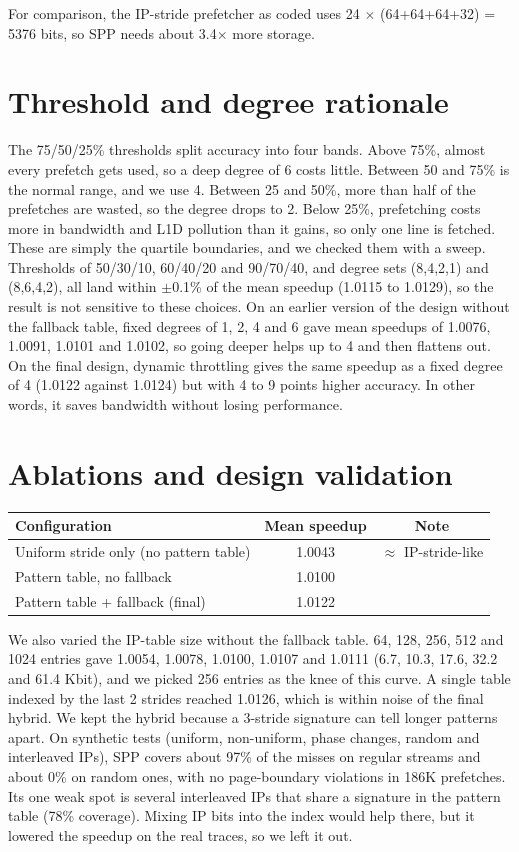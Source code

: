 \documentclass[10pt]{article}
\begin{document}
For comparison, the IP-stride prefetcher as coded uses 24 $\times$ (64+64+64+32) = 5376 bits, so SPP needs about 3.4$\times$ more storage.

\section*{Threshold and degree rationale}
The 75/50/25\% thresholds split accuracy into four bands. Above 75\%, almost every prefetch gets used, so a deep degree of 6 costs little. Between 50 and 75\% is the normal range, and we use 4. Between 25 and 50\%, more than half of the prefetches are wasted, so the degree drops to 2. Below 25\%, prefetching costs more in bandwidth and L1D pollution than it gains, so only one line is fetched. These are simply the quartile boundaries, and we checked them with a sweep. Thresholds of 50/30/10, 60/40/20 and 90/70/40, and degree sets (8,4,2,1) and (8,6,4,2), all land within $\pm$0.1\% of the mean speedup (1.0115 to 1.0129), so the result is not sensitive to these choices. On an earlier version of the design without the fallback table, fixed degrees of 1, 2, 4 and 6 gave mean speedups of 1.0076, 1.0091, 1.0101 and 1.0102, so going deeper helps up to 4 and then flattens out. On the final design, dynamic throttling gives the same speedup as a fixed degree of 4 (1.0122 against 1.0124) but with 4 to 9 points higher accuracy. In other words, it saves bandwidth without losing performance.

\section*{Ablations and design validation}
\begin{tabular}{lcc}\toprule Configuration & Mean speedup & Note\\\midrule
Uniform stride only (no pattern table) & 1.0043 & $\approx$ IP-stride-like\\
Pattern table, no fallback & 1.0100 & \\
Pattern table + fallback (final) & 1.0122 & \\\bottomrule\end{tabular}

We also varied the IP-table size without the fallback table. 64, 128, 256, 512 and 1024 entries gave 1.0054, 1.0078, 1.0100, 1.0107 and 1.0111 (6.7, 10.3, 17.6, 32.2 and 61.4 Kbit), and we picked 256 entries as the knee of this curve. A single table indexed by the last 2 strides reached 1.0126, which is within noise of the final hybrid. We kept the hybrid because a 3-stride signature can tell longer patterns apart. On synthetic tests (uniform, non-uniform, phase changes, random and interleaved IPs), SPP covers about 97\% of the misses on regular streams and about 0\% on random ones, with no page-boundary violations in 186K prefetches. Its one weak spot is several interleaved IPs that share a signature in the pattern table (78\% coverage). Mixing IP bits into the index would help there, but it lowered the speedup on the real traces, so we left it out.
\end{document}
